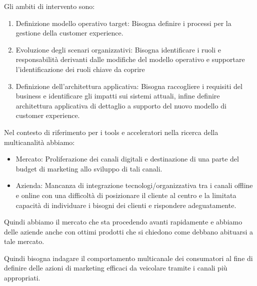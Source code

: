 \documentclass[11pt]{article}
\begin{document}
\noindent Gli ambiti di intervento sono:
\begin{enumerate}[noitemsep,topsep=0ex]
	\item Definizione modello operativo target: Bisogna definire i processi per la gestione della customer experience.
	\item Evoluzione degli scenari organizzativi: Bisogna identificare i ruoli e responsabilità derivanti dalle modifiche del modello operativo e supportare l'identificazione dei ruoli chiave da coprire
	\item Definizione dell'architettura applicativa: Bisogna raccogliere i requisiti del business e identificare gli impatti sui sistemi attuali, infine definire architettura applicativa di dettaglio a supporto del nuovo modello di customer experience.
\end{enumerate}

Nel contesto di riferimento per i tools e acceleratori nella ricerca della multicanalità abbiamo:
\begin{itemize}[noitemsep,topsep=0ex]
	\item Mercato: Proliferazione dei canali digitali e destinazione di una parte del budget di marketing allo sviluppo di tali canali.
	\item Azienda: Mancanza di integrazione tecnologi/organizzativa tra i canali offline e online con una difficoltà di posizionare il cliente al centro e la limitata capacità di individuare i bisogni dei clienti e rispondere adeguatamente.
\end{itemize}
Quindi abbiamo il mercato che sta procedendo avanti rapidamente e abbiamo delle aziende anche con ottimi prodotti che si chiedono come debbano abituarsi a tale mercato.

Quindi bisogna indagare il comportamento multicanale dei consumatori al fine di definire delle azioni di marketing efficaci da veicolare tramite i canali più appropriati.
\end{document}
